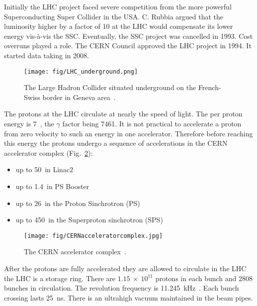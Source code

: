 Initially the LHC project faced severe competition from the more powerful Superconducting Super Collider in the USA. C. Rubbia argued that the luminosity higher by a factor of 10 at the LHC would compensate its lower energy vis-à-vis the SSC. Eventually, the SSC project was cancelled in 1993. Cost overruns played a role. The CERN Council approved the LHC project in 1994. It started data taking in 2008.

\begin{figure}[htpb]
  \centering
  \texttt{[image: fig/LHC\_underground.png]}
  \caption{The Large Hadron Collider situated underground on the French-Swiss border in Geneva area~\cite{cds:LHCunderground}.}
  \label{fig:LHC_underground}
\end{figure}

The protons at the LHC circulate at nearly the speed of light. The per proton energy is 7~\TeV, the $\gamma$ factor being 7461. It is not practical to accelerate a proton from zero velocity to such an energy in one accelerator. Therefore before reaching this energy the protons undergo a sequence of accelerations in the CERN accelerator complex (Fig.~\ref{fig:CERN_accelerator_complex}):

\begin{itemize}
\item up to 50~\MeV in Linac2
\item up to 1.4~\GeV in PS Booster
\item up to 26~\GeV in the Proton Sinchrotron (PS)
\item up to 450~\GeV in the Superproton sinchrotron (SPS)
\end{itemize}

\begin{figure}[H]
  \centering
  \texttt{[image: fig/CERNacceleratorcomplex.jpg]}
  \caption{The CERN accelerator complex~\cite{espace:CERNacceleratorcomplex}.}
  \label{fig:CERN_accelerator_complex}
\end{figure}

After the protons are fully accelerated they are allowed to circulate in the LHC \textendash the LHC is a storage ring. There are $1.15~\times~10^{11}$ protons in each bunch and 2808 bunches in circulation. The revolution frequency is 11.245~kHz~\cite{Bruning:2004ej}. Each bunch crossing lasts 25~ns. There is an ultrahigh vacuum maintained in the beam pipes.

